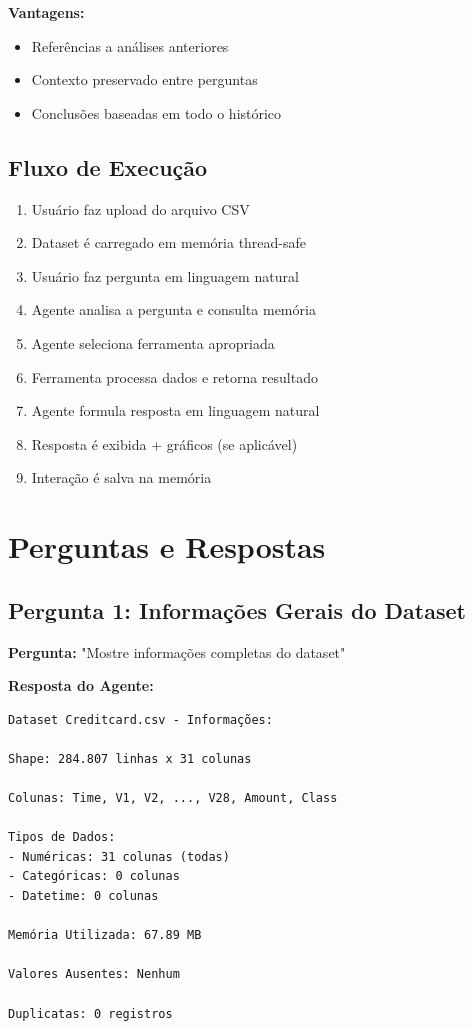 \documentclass[12pt,a4paper]{article}
\begin{document}
\textbf{Vantagens:}
\begin{itemize}
    \item Referências a análises anteriores
    \item Contexto preservado entre perguntas
    \item Conclusões baseadas em todo o histórico
\end{itemize}

\subsection{Fluxo de Execução}

\begin{enumerate}
    \item Usuário faz upload do arquivo CSV
    \item Dataset é carregado em memória thread-safe
    \item Usuário faz pergunta em linguagem natural
    \item Agente analisa a pergunta e consulta memória
    \item Agente seleciona ferramenta apropriada
    \item Ferramenta processa dados e retorna resultado
    \item Agente formula resposta em linguagem natural
    \item Resposta é exibida + gráficos (se aplicável)
    \item Interação é salva na memória
\end{enumerate}

\newpage
\section{Perguntas e Respostas}

\subsection{Pergunta 1: Informações Gerais do Dataset}

\textbf{Pergunta:} "Mostre informações completas do dataset"

\textbf{Resposta do Agente:}
\begin{verbatim}
Dataset Creditcard.csv - Informações:

Shape: 284.807 linhas x 31 colunas

Colunas: Time, V1, V2, ..., V28, Amount, Class

Tipos de Dados:
- Numéricas: 31 colunas (todas)
- Categóricas: 0 colunas
- Datetime: 0 colunas

Memória Utilizada: 67.89 MB

Valores Ausentes: Nenhum

Duplicatas: 0 registros
\end{verbatim}
\end{document}
